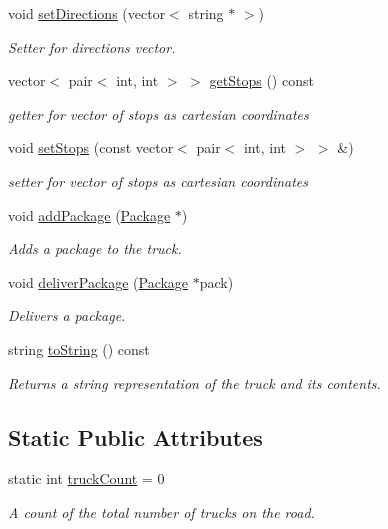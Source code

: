 \begin{DoxyCompactItemize}
void \hyperlink{classTruck_ad08c796603bfc23896abe4d71ac7a9ac}{set\+Directions} (vector$<$ string $\ast$ $>$)
\begin{DoxyCompactList}\small\item\em Setter for directions vector. \end{DoxyCompactList}\item 
vector$<$ pair$<$ int, int $>$ $>$ \hyperlink{classTruck_a511bd8447763c46b25a131b4decb04c5}{get\+Stops} () const 
\begin{DoxyCompactList}\small\item\em getter for vector of stops as cartesian coordinates \end{DoxyCompactList}\item 
void \hyperlink{classTruck_a7d021abea77aac57190922a78279edcd}{set\+Stops} (const vector$<$ pair$<$ int, int $>$ $>$ \&)
\begin{DoxyCompactList}\small\item\em setter for vector of stops as cartesian coordinates \end{DoxyCompactList}\item 
void \hyperlink{classTruck_ad4c15f435c3e7f7851b7ffa018ac198e}{add\+Package} (\hyperlink{classPackage}{Package} $\ast$)
\begin{DoxyCompactList}\small\item\em Adds a package to the truck. \end{DoxyCompactList}\item 
void \hyperlink{classTruck_a51d480fbf34068dcd6512f8fd43aadf9}{deliver\+Package} (\hyperlink{classPackage}{Package} $\ast$pack)
\begin{DoxyCompactList}\small\item\em Delivers a package. \end{DoxyCompactList}\item 
string \hyperlink{classTruck_afc282688d1ad6a3ad79a0060c4e7d63c}{to\+String} () const 
\begin{DoxyCompactList}\small\item\em Returns a string representation of the truck and its contents. \end{DoxyCompactList}\end{DoxyCompactItemize}
\subsection*{Static Public Attributes}
\begin{DoxyCompactItemize}
\item 
static int \hyperlink{classTruck_a7435e6c1e97d263f36897f8ade5d4c41}{truck\+Count} = 0
\begin{DoxyCompactList}\small\item\em A count of the total number of trucks on the road. \end{DoxyCompactList}\end{DoxyCompactItemize}

